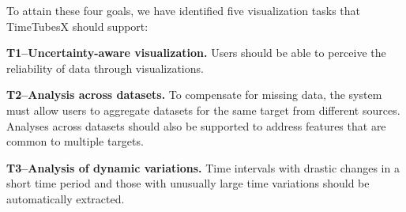 
To attain these four goals, we have identified five visualization tasks that TimeTubesX should support:

\noindent\textbf{T1--Uncertainty-aware visualization.} 
Users should be able to perceive the reliability of data through visualizations. 

\noindent\textbf{T2--Analysis across datasets.} 
To compensate for missing data, 
the system must allow users to aggregate datasets for the same target from different sources.
Analyses across datasets should also be supported to address features that are common to multiple targets.

\noindent\textbf{T3--Analysis of dynamic variations.} 
Time intervals with drastic changes in a short time period and those with unusually large time variations should be automatically extracted.

